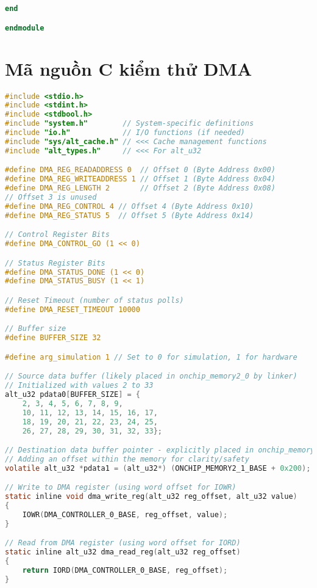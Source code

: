 \begin{lstlisting}[language=Verilog, caption={WRITE\_MASTER.v - Avalon Write Master Module}, label=lst:verilog_writemaster]
    end

endmodule
\end{lstlisting}

\section{Mã nguồn C kiểm thử DMA}
\label{app:c_code}
\begin{lstlisting}[language=C, caption={hello\_world.c - Nios V DMA Test Application}, label=lst:c_helloworld]
#include <stdio.h>
#include <stdint.h>
#include <stdbool.h>
#include "system.h"        // System-specific definitions
#include "io.h"            // I/O functions (if needed)
#include "sys/alt_cache.h" // <<< Cache management functions
#include "alt_types.h"     // <<< For alt_u32

#define DMA_REG_READADDRESS 0  // Offset 0 (Byte Address 0x00)
#define DMA_REG_WRITEADDRESS 1 // Offset 1 (Byte Address 0x04)
#define DMA_REG_LENGTH 2       // Offset 2 (Byte Address 0x08)
// Offset 3 is unused
#define DMA_REG_CONTROL 4 // Offset 4 (Byte Address 0x10)
#define DMA_REG_STATUS 5  // Offset 5 (Byte Address 0x14)

// Control Register Bits
#define DMA_CONTROL_GO (1 << 0)

// Status Register Bits
#define DMA_STATUS_DONE (1 << 0)
#define DMA_STATUS_BUSY (1 << 1)

// Reset Timeout (number of status polls)
#define DMA_RESET_TIMEOUT 10000

// Buffer size
#define BUFFER_SIZE 32

#define arg_simulation 1 // Set to 0 for simulation, 1 for hardware

// Source data buffer (likely placed in onchip_memory2_0 by linker)
// Initialized with values 2 to 33
alt_u32 pdata0[BUFFER_SIZE] = {
    2, 3, 4, 5, 6, 7, 8, 9,
    10, 11, 12, 13, 14, 15, 16, 17,
    18, 19, 20, 21, 22, 23, 24, 25,
    26, 27, 28, 29, 30, 31, 32, 33};

// Destination data buffer pointer - explicitly placed in onchip_memory2_1
// Adding an offset within the memory for clarity/safety
volatile alt_u32 *pdata1 = (alt_u32*) (ONCHIP_MEMORY2_1_BASE + 0x200); // Offset 0x100 within mem 1

// Write to DMA register (using word offset for IOWR)
static inline void dma_write_reg(alt_u32 reg_offset, alt_u32 value)
{
    IOWR(DMA_CONTROLLER_0_BASE, reg_offset, value);
}

// Read from DMA register (using word offset for IORD)
static inline alt_u32 dma_read_reg(alt_u32 reg_offset)
{
    return IORD(DMA_CONTROLLER_0_BASE, reg_offset);
}


\end{lstlisting}
